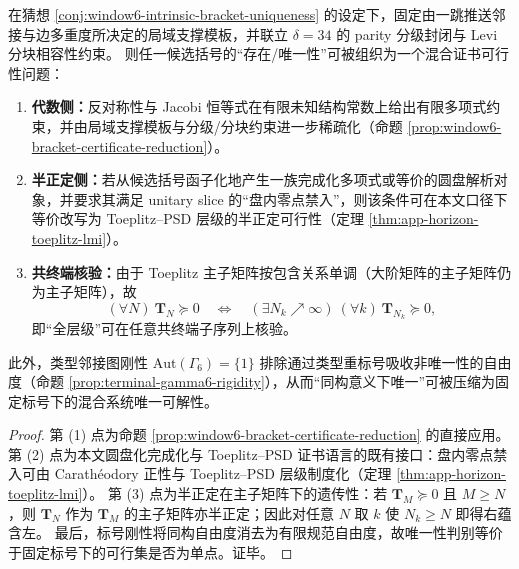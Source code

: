 \begin{theorem}\label{thm:window6-bracket-uniqueness-mixed-certificate-reduction}
在猜想 \ref{conj:window6-intrinsic-bracket-uniqueness} 的设定下，固定由一跳推送邻接与边多重度所决定的局域支撑模板，并联立 \(\delta=34\) 的 parity 分级封闭与 Levi 分块相容性约束。
则任一候选括号的“存在/唯一性”可被组织为一个混合证书可行性问题：
\begin{enumerate}
  \item \textbf{代数侧：}反对称性与 Jacobi 恒等式在有限未知结构常数上给出有限多项式约束，并由局域支撑模板与分级/分块约束进一步稀疏化（命题 \ref{prop:window6-bracket-certificate-reduction}）。
  \item \textbf{半正定侧：}若从候选括号函子化地产生一族完成化多项式或等价的圆盘解析对象，并要求其满足 unitary slice 的“盘内零点禁入”，则该条件可在本文口径下等价改写为 Toeplitz--PSD 层级的半正定可行性（定理 \ref{thm:app-horizon-toeplitz-lmi}）。
  \item \textbf{共终端核验：}由于 Toeplitz 主子矩阵按包含关系单调（大阶矩阵的主子矩阵仍为主子矩阵），故
  \[
  (\forall N)\ \mathbf T_N\succeq 0
  \quad\Longleftrightarrow\quad
  (\exists N_k\nearrow\infty)\ (\forall k)\ \mathbf T_{N_k}\succeq 0,
  \]
  即“全层级”可在任意共终端子序列上核验。
\end{enumerate}
此外，类型邻接图刚性 \(\mathrm{Aut}(\Gamma_6)=\{1\}\) 排除通过类型重标号吸收非唯一性的自由度（命题 \ref{prop:terminal-gamma6-rigidity}），从而“同构意义下唯一”可被压缩为固定标号下的混合系统唯一可解性。
\end{theorem}

\begin{proof}
第 (1) 点为命题 \ref{prop:window6-bracket-certificate-reduction} 的直接应用。
第 (2) 点为本文圆盘化完成化与 Toeplitz--PSD 证书语言的既有接口：盘内零点禁入可由 Carath\'eodory 正性与 Toeplitz--PSD 层级制度化（定理 \ref{thm:app-horizon-toeplitz-lmi}）。
第 (3) 点为半正定在主子矩阵下的遗传性：若 \(\mathbf T_M\succeq 0\) 且 \(M\ge N\)，则 \(\mathbf T_N\) 作为 \(\mathbf T_M\) 的主子矩阵亦半正定；因此对任意 \(N\) 取 \(k\) 使 \(N_k\ge N\) 即得右蕴含左。
最后，标号刚性将同构自由度消去为有限规范自由度，故唯一性判别等价于固定标号下的可行集是否为单点。证毕。
\end{proof}
